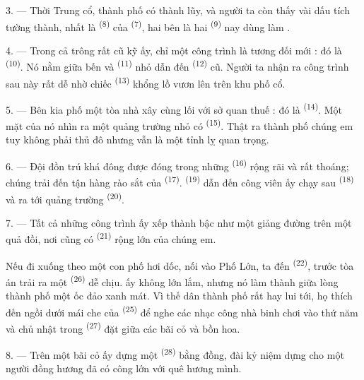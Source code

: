 3. --- Thời Trung cổ, thành phố có thành lũy, và người ta còn thấy vài dấu tích tường
thành, nhất là  \textsuperscript{(8)} của 
\textsuperscript{(7)}, hai bên là hai  \textsuperscript{(9)} nay dùng làm
.

4. --- Trong cả  trông rất cũ kỹ ấy, chỉ một công trình là tương đối
mới : đó là  \textsuperscript{(10)}. Nó nằm giữa bến và
 \textsuperscript{(11)} nhỏ dẫn đến 
\textsuperscript{(12)} cũ. Người ta nhận ra công trình sau này rất dễ nhờ chiếc
 \textsuperscript{(13)} khổng lồ vươn lên trên khu phố cổ.

5. --- Bên kia phố  một tòa nhà xây cùng lối với sở quan thuế : đó là
 \textsuperscript{(14)}. Một mặt của nó nhìn ra một quảng trường nhỏ
có  \textsuperscript{(15)}. Thật ra thành phố chúng em tuy không phải thủ
đô nhưng vẫn là một tỉnh lỵ quan trọng.

\VUsaut{5.0mm}
\VUsaut{3.4mm}

6. --- Đội đồn trú khá đông được đóng trong những 
\textsuperscript{(16)} rộng rãi và rất thoáng; chúng trải đến tận hàng rào sắt của
 \textsuperscript{(17)}. 
\textsuperscript{(19)} dẫn đến công viên ấy chạy sau 
\textsuperscript{(18)} và ra tới quảng trường 
\textsuperscript{(20)}.

7. --- Tất cả những công trình ấy xếp thành bậc như một giảng đường trên một quả đồi, nơi
cũng có  \textsuperscript{(21)} rộng lớn của chúng em.

Nếu đi xuống theo một con phố hơi dốc, nối vào Phố Lớn, ta đến 
\textsuperscript{(22)}, trước tòa án trải ra một 
\textsuperscript{(26)} dễ chịu.  ấy không lớn lắm, nhưng nó làm thành
giữa lòng thành phố một ốc đảo xanh mát. Vì thế dân thành phố rất hay lui tới, họ thích
đến ngồi dưới mái che của  \textsuperscript{(25)} để nghe các nhạc
công nhà binh chơi vào thứ năm và chủ nhật trong 
\textsuperscript{(27)} đặt giữa các bãi cỏ và bồn hoa.

8. --- Trên một bãi cỏ ấy dựng một  \textsuperscript{(28)} bằng đồng,
đài kỷ niệm dựng cho một người đồng hương đã có công lớn với quê hương mình.

